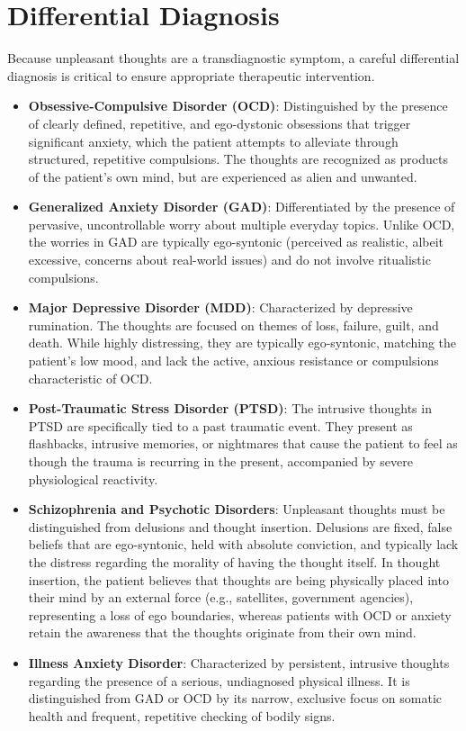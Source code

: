 \section*{Differential Diagnosis}
Because unpleasant thoughts are a transdiagnostic symptom, a careful differential diagnosis is critical to ensure appropriate therapeutic intervention.
\begin{itemize}
  \item \textbf{Obsessive-Compulsive Disorder (OCD)}: Distinguished by the presence of clearly defined, repetitive, and ego-dystonic obsessions that trigger significant anxiety, which the patient attempts to alleviate through structured, repetitive compulsions. The thoughts are recognized as products of the patient's own mind, but are experienced as alien and unwanted.
  \item \textbf{Generalized Anxiety Disorder (GAD)}: Differentiated by the presence of pervasive, uncontrollable worry about multiple everyday topics. Unlike OCD, the worries in GAD are typically ego-syntonic (perceived as realistic, albeit excessive, concerns about real-world issues) and do not involve ritualistic compulsions.
  \item \textbf{Major Depressive Disorder (MDD)}: Characterized by depressive rumination. The thoughts are focused on themes of loss, failure, guilt, and death. While highly distressing, they are typically ego-syntonic, matching the patient's low mood, and lack the active, anxious resistance or compulsions characteristic of OCD.
  \item \textbf{Post-Traumatic Stress Disorder (PTSD)}: The intrusive thoughts in PTSD are specifically tied to a past traumatic event. They present as flashbacks, intrusive memories, or nightmares that cause the patient to feel as though the trauma is recurring in the present, accompanied by severe physiological reactivity.
  \item \textbf{Schizophrenia and Psychotic Disorders}: Unpleasant thoughts must be distinguished from delusions and thought insertion. Delusions are fixed, false beliefs that are ego-syntonic, held with absolute conviction, and typically lack the distress regarding the morality of having the thought itself. In thought insertion, the patient believes that thoughts are being physically placed into their mind by an external force (e.g., satellites, government agencies), representing a loss of ego boundaries, whereas patients with OCD or anxiety retain the awareness that the thoughts originate from their own mind.
  \item \textbf{Illness Anxiety Disorder}: Characterized by persistent, intrusive thoughts regarding the presence of a serious, undiagnosed physical illness. It is distinguished from GAD or OCD by its narrow, exclusive focus on somatic health and frequent, repetitive checking of bodily signs.

\end{itemize}
